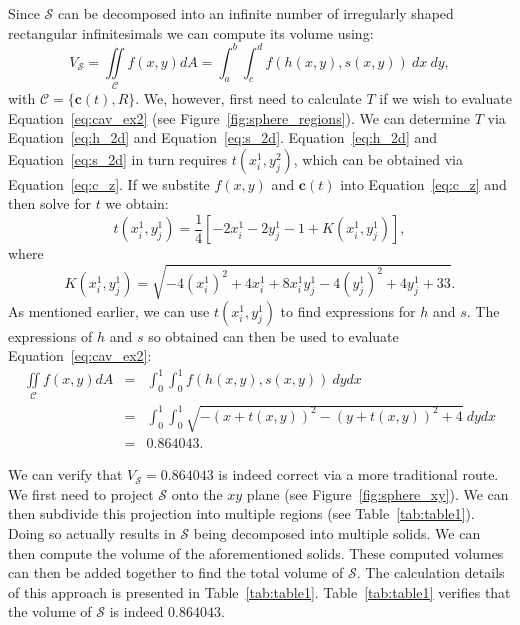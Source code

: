 \documentclass{article}
\theoremstyle{theorem}
\theoremstyle{definition}
\begin{document}
\noindent
Since $\mathcal{S}$ can be decomposed into an infinite number of irregularly shaped rectangular infinitesimals we can compute its volume using:
\begin{equation}
\label{eq:cav_ex2}
V_{\mathcal{S}} = \iint\limits_{\!\mathcal{C}} f(x,y) dA =  \int_a^b\int_c^d f(h(x,y),s(x,y))~dx~dy,
\end{equation}
with $\mathcal{C}=\{\mathbf{c}(t),R\}$. We, however, first need to calculate $T$ if we wish to evaluate Equation~\eqref{eq:cav_ex2} (see Figure~\ref{fig:sphere_regions}). We can determine $T$ via 
Equation~\eqref{eq:h_2d} and Equation~\eqref{eq:s_2d}. Equation~\eqref{eq:h_2d} and Equation~\eqref{eq:s_2d} in turn requires $t(x_i^1,y_j^2)$, which can be obtained via Equation~\eqref{eq:c_z}.
If we substite $f(x,y)$ and $\mathbf{c}(t)$ into Equation~\eqref{eq:c_z} and then solve for $t$ we obtain:
\begin{equation}
t(x_{i}^1,y_{j}^1) = \frac{1}{4}[-2 x_{i}^1 - 2 y_{j}^1  -  1 + K(x_{i}^1,y_{j}^1)],\nonumber
\end{equation}
where
\begin{equation}
K(x_{i}^1,y_{j}^1) = \sqrt{-4(x_{i}^1)^2+4x_{i}^1+8x_{i}^1y_{j}^1-4(y_{j}^1)^2+4y_{j}^1 + 33}.\nonumber
\end{equation}
As mentioned earlier, we can use $t(x_i^1,y_j^1)$ to find expressions for $h$ and $s$. The expressions of $h$ and $s$ so obtained can then be used to evaluate Equation~\eqref{eq:cav_ex2}:  
\begin{eqnarray}
\iint\limits_{\!\mathcal{C}} f(x,y) dA &=& \int_0^1\int_0^1 f(h(x,y),s(x,y))~dydx\nonumber\\
&=& \int_0^1 \int_0^1 \sqrt{-(x+t(x,y))^2 - (y+t(x,y))^2 + 4} ~dydx\nonumber\\
&=& 0.864043.\nonumber
\end{eqnarray}

\noindent
We can verify that $V_{\mathcal{S}}=0.864043$ is indeed correct via a more traditional route. We first need to project $\mathcal{S}$ onto the $xy$ plane (see Figure~\ref{fig:sphere_xy}). We can then subdivide this projection into multiple regions (see Table~\ref{tab:table1}). Doing so actually results in $\mathcal{S}$ being decomposed into multiple solids. We can then 
compute the volume of the aforementioned solids. These computed volumes can then be added together to find the total volume of $\mathcal{S}$. The calculation details 
of this approach is presented in Table~\ref{tab:table1}. Table~\ref{tab:table1} verifies that the volume of $\mathcal{S}$ is indeed $0.864043$.
\end{document}
